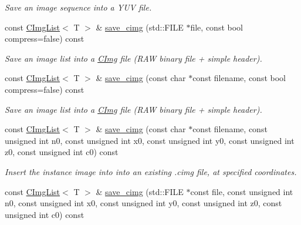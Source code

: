 \begin{DoxyCompactItemize}
\begin{DoxyCompactList}\small\item\em Save an image sequence into a YUV file. \item\end{DoxyCompactList}\item 
\hypertarget{structcimg__library_1_1CImgList_a975ee8602db4ee405284e199e177d239}{
const \hyperlink{structcimg__library_1_1CImgList}{CImgList}$<$ T $>$ \& \hyperlink{structcimg__library_1_1CImgList_a975ee8602db4ee405284e199e177d239}{save\_\-cimg} (std::FILE $\ast$file, const bool compress=false) const }
\label{structcimg__library_1_1CImgList_a975ee8602db4ee405284e199e177d239}

\begin{DoxyCompactList}\small\item\em Save an image list into a \hyperlink{structcimg__library_1_1CImg}{CImg} file (RAW binary file + simple header). \item\end{DoxyCompactList}\item 
\hypertarget{structcimg__library_1_1CImgList_a40c2aa789c4ef09df224acb0634ac96f}{
const \hyperlink{structcimg__library_1_1CImgList}{CImgList}$<$ T $>$ \& \hyperlink{structcimg__library_1_1CImgList_a40c2aa789c4ef09df224acb0634ac96f}{save\_\-cimg} (const char $\ast$const filename, const bool compress=false) const }
\label{structcimg__library_1_1CImgList_a40c2aa789c4ef09df224acb0634ac96f}

\begin{DoxyCompactList}\small\item\em Save an image list into a \hyperlink{structcimg__library_1_1CImg}{CImg} file (RAW binary file + simple header). \item\end{DoxyCompactList}\item 
\hypertarget{structcimg__library_1_1CImgList_ab1591fa04951c4c11e30fb9813806f2e}{
const \hyperlink{structcimg__library_1_1CImgList}{CImgList}$<$ T $>$ \& \hyperlink{structcimg__library_1_1CImgList_ab1591fa04951c4c11e30fb9813806f2e}{save\_\-cimg} (const char $\ast$const filename, const unsigned int n0, const unsigned int x0, const unsigned int y0, const unsigned int z0, const unsigned int c0) const }
\label{structcimg__library_1_1CImgList_ab1591fa04951c4c11e30fb9813806f2e}

\begin{DoxyCompactList}\small\item\em Insert the instance image into into an existing .cimg file, at specified coordinates. \item\end{DoxyCompactList}\item 
\hypertarget{structcimg__library_1_1CImgList_ac8f8a249c4c75634265db9bf0ae2e54e}{
const \hyperlink{structcimg__library_1_1CImgList}{CImgList}$<$ T $>$ \& \hyperlink{structcimg__library_1_1CImgList_ac8f8a249c4c75634265db9bf0ae2e54e}{save\_\-cimg} (std::FILE $\ast$const file, const unsigned int n0, const unsigned int x0, const unsigned int y0, const unsigned int z0, const unsigned int c0) const }
\label{structcimg__library_1_1CImgList_ac8f8a249c4c75634265db9bf0ae2e54e}


\end{DoxyCompactItemize}

